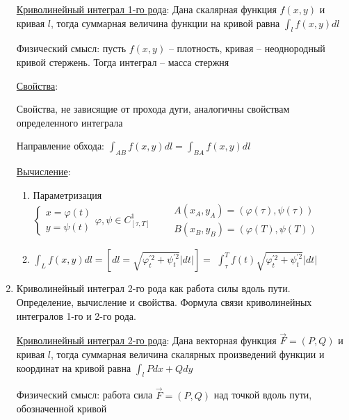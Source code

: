 \documentclass[12pt]{article}
\begin{document}
\begin{enumerate}
        \hyperlink{curvilinearintegraloffirstkind}{Криволинейный интеграл 1-го рода}: Дана скалярная функция $f(x, y)$ и кривая $l$, тогда суммарная величина функции на кривой равна $\int_l f(x, y) dl$

        Физический смысл: пусть $f(x, y)$ -- плотность, кривая -- неоднородный кривой стержень. Тогда интеграл -- масса стержня

        \hyperlink{curvilinearintegraloffirstkindproperties}{Свойства}:

        Свойства, не зависящие от прохода дуги, аналогичны свойствам определенного интеграла

        Направление обхода: $\int_{AB} f(x, y)dl = \int_{BA} f(x, y)dl$

        \hyperlink{curvilinearintegraloffirstkindcalculation}{Вычисление}:

        \begin{enumerate}
            \item Параметризация $\begin{cases}
                x = \varphi(t) \\
                y = \psi(t)
            \end{cases} \varphi, \psi \in C^1_{[\tau, T]} \quad\quad \begin{matrix}
                A(x_A, y_A) = (\varphi(\tau), \psi(\tau)) \\
                B(x_B, y_B) = (\varphi(T), \psi(T))
            \end{matrix}$

            \item $\int_{L} f(x, y) dl = \left[dl = \sqrt{\varphi_t^{\prime 2} + \psi_t^{\prime 2}}|dt|\right] = $
            $\int_\tau^T f(t) \sqrt{\varphi_t^{\prime 2} + \psi_t^{\prime 2}}|dt|$
        \end{enumerate}

        \item Криволинейный интеграл 2-го рода как работа силы вдоль пути. Определение, вычисление и свойства. Формула связи криволинейных интегралов 1-го и 2-го рода.

        \hyperlink{curvilinearintegralofsecondkind}{Криволинейный интеграл 2-го рода}:
        Дана векторная функция $\overrightarrow{F} = (P, Q)$ и кривая $l$, тогда суммарная величина скалярных произведений функции и координат на кривой равна $\int_{l} Pdx + Qdy$

        Физический смысл: работа сила $\overrightarrow{F} = (P, Q)$ над точкой вдоль пути, обозначенной кривой


\end{enumerate}
\end{document}

